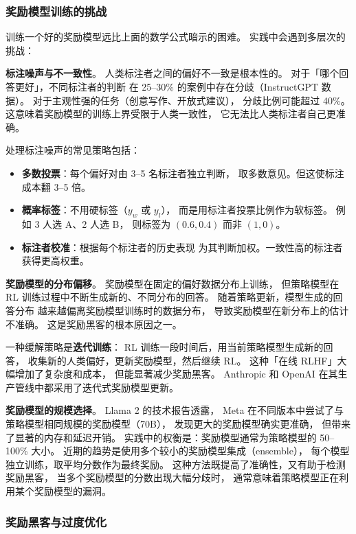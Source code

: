 \subsubsection{奖励模型训练的挑战}

训练一个好的奖励模型远比上面的数学公式暗示的困难。
实践中会遇到多层次的挑战：

\textbf{标注噪声与不一致性}。
人类标注者之间的偏好不一致是根本性的。
对于「哪个回答更好」，不同标注者的判断
在 25--30\% 的案例中存在分歧（InstructGPT 数据）。
对于主观性强的任务（创意写作、开放式建议），
分歧比例可能超过 40\%。
这意味着奖励模型的训练上界受限于人类一致性，
它无法比人类标注者自己更准确。

处理标注噪声的常见策略包括：
\begin{itemize}[noitemsep]
  \item \textbf{多数投票}：每个偏好对由 3--5 名标注者独立判断，
        取多数意见。但这使标注成本翻 3--5 倍。
  \item \textbf{概率标签}：不用硬标签（$y_w$ 或 $y_l$），
        而是用标注者投票比例作为软标签。
        例如 3 人选 A、2 人选 B，
        则标签为 $(0.6, 0.4)$ 而非 $(1, 0)$。
  \item \textbf{标注者校准}：根据每个标注者的历史表现
        为其判断加权。一致性高的标注者获得更高权重。
\end{itemize}

\textbf{奖励模型的分布偏移}。
奖励模型在固定的偏好数据分布上训练，
但策略模型在 RL 训练过程中不断生成新的、不同分布的回答。
随着策略更新，模型生成的回答分布
越来越偏离奖励模型训练时的数据分布，
导致奖励模型在新分布上的估计不准确。
这是奖励黑客的根本原因之一。

一种缓解策略是\textbf{迭代训练}：
RL 训练一段时间后，用当前策略模型生成新的回答，
收集新的人类偏好，更新奖励模型，然后继续 RL。
这种「在线 RLHF」大幅增加了复杂度和成本，
但能显著减少奖励黑客。
Anthropic 和 OpenAI 在其生产管线中都采用了迭代式奖励模型更新。

\textbf{奖励模型的规模选择}。
Llama 2 的技术报告透露，
Meta 在不同版本中尝试了与策略模型相同规模的奖励模型（70B），
发现更大的奖励模型确实更准确，
但带来了显著的内存和延迟开销。
实践中的权衡是：奖励模型通常为策略模型的 50--100\% 大小。
近期的趋势是使用多个较小的奖励模型集成（ensemble），
每个模型独立训练，取平均分数作为最终奖励。
这种方法既提高了准确性，又有助于检测奖励黑客，
当多个奖励模型的分数出现大幅分歧时，
通常意味着策略模型正在利用某个奖励模型的漏洞。

\subsubsection{奖励黑客与过度优化}

